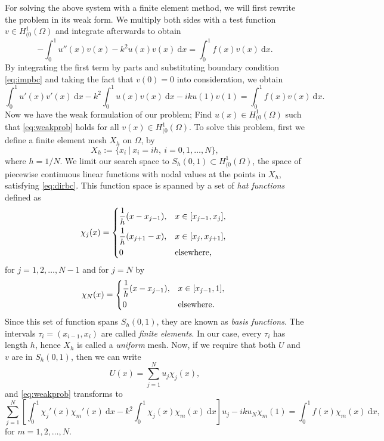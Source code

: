 \documentclass[a4paper]{article}
\newcommand{\dd}{\mathrm{d}}
\newcommand{\HOzero}{\ensuremath{H^1_{(0}(\Omega)}}
\begin{document}
For solving the above system with a finite element method, we will
first rewrite the problem in its weak form.  We multiply both sides
with a test function $v \in \HOzero$ and integrate afterwards to
obtain
\begin{equation}
  - \int^1_0 u''(x)v(x) - k^2u(x)v(x) \ \dd x = \int^1_0 f(x)v(x) \ \dd x.
\end{equation}
By integrating the first term by parts and substituting boundary
condition \eqref{eq:impbc} and taking the fact that $v(0) = 0$ into
consideration, we obtain
\begin{equation} \label{eq:weakprob}
  \int^1_0 u'(x)v'(x)\ \dd x - k^2 \int^1_0 u(x)v(x) \ \dd x - iku(1)v(1) = \int^1_0 f(x)v(x) \ \dd x.
\end{equation}
Now we have the weak formulation of our problem; Find $u(x) \in
\HOzero$ such that \eqref{eq:weakprob} holds for all $v(x) \in
\HOzero$.  To solve this problem, first we define a finite element
mesh $X_h$ on $\Omega$, by
\begin{equation}
  X_h := \{ x_i \ | \ x_i = ih, \ i = 0, 1, \ldots, N \},
\end{equation}
where $h = 1/N$.
We limit our search space to $S_h(0,1) \subset \HOzero$, the space of
piecewise continuous linear functions with nodal values at the points
in $X_h$, satisfying \eqref{eq:dirbc}. This function space is spanned
by a set of \emph{hat functions} defined as
\begin{equation}
  \chi_j(x) = \begin{dcases*}
    \frac{1}{h} (x - x_{j - 1}), & $x \in [x_{j - 1}, x_j],$ \\
    \frac{1}{h} (x_{j + 1} - x), & $x \in [x_{j}, x_{j + 1}],$ \\
    0 & elsewhere,
  \end{dcases*}
\end{equation}
for $j = 1, 2, \ldots, N - 1$ and for $j = N$ by
\begin{equation}
  \chi_N(x) = \begin{dcases*}
    \frac{1}{h} (x - x_{j - 1}), & $x \in [x_{j - 1}, 1],$ \\
    0 & elsewhere.
  \end{dcases*}
\end{equation}
Since this set of function spans $S_h(0,1)$, they are known as
\emph{basis functions}. The intervals $\tau_i = (x_{i - 1}, x_i)$ are
called \emph{finite elements}. In our case, every $\tau_i$ has length
$h$, hence $X_h$ is called a \emph{uniform} mesh. Now, if we require
that both $U$ and $v$ are in  $S_h(0,1)$, then we can write
\begin{equation} \label{eq:Usum}
  U(x) = \sum^N_{j = 1} u_j \chi_j(x),
\end{equation}
and \eqref{eq:weakprob} transforms to
\begin{equation} \label{eq:linsys}
  \sum^N_{j = 1} \left[ \int^1_0 \chi_j'(x) \chi_m'(x) \ \dd x
    - k^2 \int^1_0 \chi_j(x) \chi_m(x) \ \dd x \right] u_j
    - i k u_N \chi_m(1)
  =
    \int^1_0 f(x) \chi_m(x) \ \dd x,
\end{equation}
for $m = 1, 2, \ldots, N$.
\end{document}
